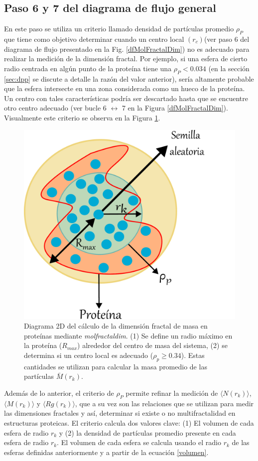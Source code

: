 	 
	 
	 \color{blue}
	 \subsection{Paso 6 y 7 del diagrama de flujo general}
	 \label{sec:paso6}
	 
	 En este paso se utiliza un criterio llamado densidad de partículas promedio $\rho_{P}$ que tiene como objetivo determinar cuando un centro local $(r_c)$(ver paso 6 del diagrama de flujo presentado en la Fig. \ref{dfMolFractalDim}) no es adecuado para realizar la medici\'{o}n de la dimensi\'{o}n fractal. Por ejemplo, si una esfera de cierto radio centrada en alg\'{u}n punto de la proteína tiene una $\rho_{P} < 0.034$ (en la sección \ref*{sec:dpp} se discute a detalle la razón del valor anterior), ser\'{i}a altamente probable que la esfera intersecte en una zona considerada como un hueco de la prote\'{i}na. Un centro con tales caracter\'{i}sticas podr\'{i}a ser descartado hasta que se encuentre otro centro adecuado (ver bucle 6 $\longleftrightarrow$ 7 en la Figura \ref{dfMolFractalDim}). Visualmente este criterio se observa en la Figura \ref{fig:centrob}. 
	 	 \color{black}
	 
	 	\begin{figure}[H]
	 	\centering
	 	\includegraphics[width=0.5\linewidth]{graphs/centrob4.pdf}
	 	\caption{Diagrama 2D del c\'{a}lculo de la dimensi\'{o}n fractal de masa en prote\'{i}nas mediante \textit{molfractaldim}. (1) Se define un radio m\'{a}ximo en la prote\'{i}na ($R_{max}$) alrededor del centro de masa del sistema, (2) se determina si un centro local es adecuado ($\rho_{p} \geq 0.34$). Estas cantidades se utilizan para calcular la masa promedio de las part\'{i}culas $\bar{M}(r_k)$.}
	 	\label{fig:centrob}
	 \end{figure}
	 
	  Además de lo anterior, el criterio de \(\rho_{P}\) permite refinar la medici\'{o}n de $\langle N(r_k) \rangle$, $\langle M(r_k) \rangle$ y $\langle Rg(r_k) \rangle$, que a su vez son las relaciones que se utilizan para medir las dimensiones fractales y as\'{i}, determinar si existe o no multifractalidad en estructuras proteicas. El criterio calcula dos valores clave: (1) El volumen de cada esfera de radio $r_k$ y (2) la densidad de partículas promedio presente en cada esfera de radio $r_k$. El volumen de cada esfera se calcula usando el radio \(r_k\) de las esferas definidas anteriormente y a partir de la ecuaci\'{o}n \ref{volumen}.\\
	 

